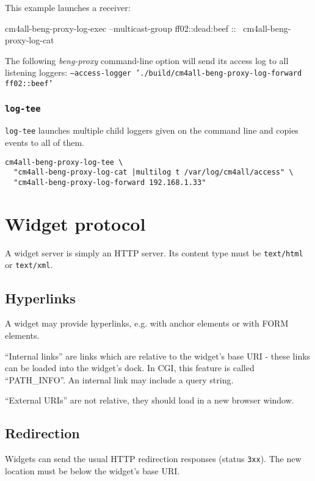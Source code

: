 \documentclass[a4paper,12pt]{article}
\begin{document}
This example launches a receiver:

\begin{verbatim*}
cm4all-beng-proxy-log-exec --multicast-group ff02::dead:beef :: \
  cm4all-beng-proxy-log-cat
\end{verbatim*}

The following \emph{beng-proxy} command-line option will send its
access log to all listening loggers: \texttt{--access-logger
  './build/cm4all-beng-proxy-log-forward ff02::beef'}


\subsubsection{\texttt{log-tee}}

\texttt{log-tee} launches multiple child loggers given on the command
line and copies events to all of them.

\begin{verbatim}
cm4all-beng-proxy-log-tee \
  "cm4all-beng-proxy-log-cat |multilog t /var/log/cm4all/access" \
  "cm4all-beng-proxy-log-forward 192.168.1.33"
\end{verbatim}


\section{Widget protocol}

A widget server is simply an HTTP server.  Its content type must be
\texttt{text/html} or \texttt{text/xml}.


\subsection{Hyperlinks}

A widget may provide hyperlinks, e.g. with anchor elements or with
FORM elements.

``Internal links'' are links which are relative to the widget's base
URI - these links can be loaded into the widget's dock.  In CGI, this
feature is called ``PATH\_INFO''.  An internal link may include a
query string.

``External URIs'' are not relative, they should
load in a new browser window.

\subsection{Redirection}

Widgets can send the usual HTTP redirection responses (status
\texttt{3xx}).  The new location must be below the widget's base URI.
\end{document}
